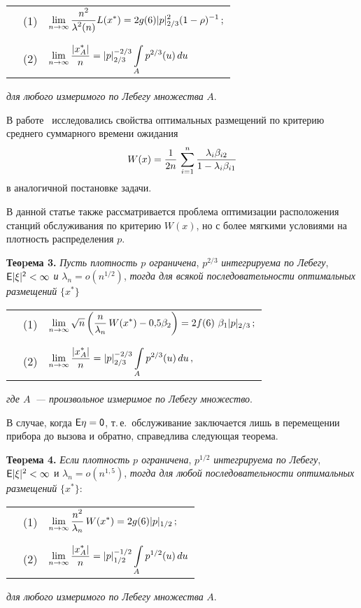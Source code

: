 \begin{multicols}{2}
\begin{center}
\begin{tabular}{lcl}
&(1)&$\lim\limits_{n\to\infty}\displaystyle\frac{\displaystyle n^2\mathstrut}{\displaystyle \lambda^2(n)\mathstrut}L(x^*)=2g(6)\vert p\vert_{2/3}^2(1-\rho)^{-1}\,;$\\
\\
&(2)&$\lim\limits_{n\to\infty}\displaystyle\frac{\displaystyle \vert x_A^*\vert \mathstrut}{\displaystyle n\mathstrut}=\vert p\vert_{2/3}^{-2/3}\int\limits_{A}^{}p^{2/3}(u)\,du$
\end{tabular}
\end{center}
{\it для любого измеримого по Лебегу множества} $A$.

В работе~\cite{2z} исследовались свойства оптимальных размещений по
критерию среднего суммарного времени ожидания 
$$
W(x)=\displaystyle\frac{\displaystyle 1\mathstrut}{\displaystyle 2n\mathstrut}\,\sum\limits_{i=1}^{n}\displaystyle\frac{\displaystyle \lambda_i\beta_{i2}\mathstrut}{\displaystyle 1-\lambda_i\beta_{i1}\mathstrut}
$$
в аналогичной постановке задачи.

В данной статье также рассматривается проблема оптимизации расположения станций обслуживания
по критерию $W(x)$, но с более мягкими условиями на плотность распределения $p$.

\smallskip
{\bf{Теоpема 3.} } {\it Пусть плотность $p$ ограничена}, $p^{2/3}$ {\it интегрируема по
Лебегу}, $\sf E\vert \xi\vert^2<\infty$ {\it и} $\lambda_n=o(n^{1/2})$,
{\it тогда для всякой
последовательности оптимальных размещений} $\{x^*\}$

\begin{center}
{\tabcolsep=0pt
\begin{tabular}{lcl}
&(1)&$\lim\limits_{n\rightarrow
\infty}\sqrt{n}\left(\displaystyle\frac{\displaystyle n\mathstrut}{\displaystyle \lambda_n\mathstrut}\,W(x^*)-0{,}5\beta_2\right)
=2 f(6)~\beta_1 \vert p\vert_{2/3}\,;$\\
\\
&(2)&$\lim\limits_{n\rightarrow\infty}\displaystyle\frac{\displaystyle \vert x_A^*\vert \mathstrut}{\displaystyle n\mathstrut}=
\vert p\vert_{2/3}^{-2/3}\int\limits_{A}^{}p^{2/3}(u)\,du\,,$
\end{tabular}
}
\end{center}
{\it где $A$~--- произвольное измеримое по Лебегу множество}.


В случае, когда $\sf E \eta=0$, т.\,е.\ обслуживание заключается лишь в перемещении прибора до
вызова и обратно, справедлива следующая теорема.

\smallskip
{\bf{Теоpема 4.} } {\it Если плотность $p$ ограничена}, $p^{1/2}$ {\it интегрируема по
Лебегу}, ${\sf E}\vert \xi\vert^2<\infty$ и $\lambda_n=o(n^{1{,}5})$, {\it тогда для любой
последовательности оптимальных размещений} $\{x^*\}:$

\begin{center}
\begin{tabular}{lcl}
&(1)&$\lim\limits_{n\rightarrow
\infty}\displaystyle\frac{\displaystyle n^2\mathstrut}{\displaystyle \lambda_n\mathstrut}\,W(x^*)=2 g(6) \vert p\vert _{1/2}\,;$\\
\\
&(2)&$\lim\limits_{n\rightarrow\infty}\displaystyle\frac{\displaystyle \vert x_A^*\vert \mathstrut}{\displaystyle n\mathstrut}=
\vert p\vert_{1/2}^{-1/2}\int\limits_{A}^{}p^{1/2}(u)\,du$
\end{tabular}
\end{center}
{\it для любого измеримого по Лебегу множества} $A$.


\end{multicols}
